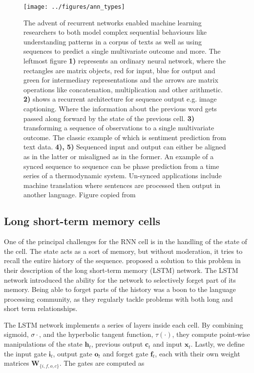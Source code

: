 \begin{figure}
\centering
\texttt{[image: ../figures/ann\_types]}
\caption[Archetypes of recurrent neural architectures]{The advent of recurrent networks enabled machine learning researchers to both model complex sequential behaviours like understanding patterns in a corpus of texts as well as using sequences to predict a single multivariate outcome and more. The leftmost figure \textbf{1)} represents an ordinary neural network, where the rectangles are matrix objects, red for input, blue for output and green for intermediary representations and the arrows are matrix operations like concatenation, multiplication and other arithmetic. \textbf{2)} shows a recurrent architecture for sequence output e.g. image captioning. Where the information about the previous word gets passed along forward by the state of the previous cell. \textbf{3)} transforming a sequence of observations to a single multivariate outcome. The classic example of which is sentiment prediction from text data. \textbf{4), 5)} Sequenced input and output can either be aligned as in the latter or misaligned as in the former. An example of a synced sequence to sequence can be phase prediction from a time series of a thermodynamic system. Un-synced applications include machine translation where sentences are processed then output in another language. Figure copied from \cite{Karpathy2015}}\label{fig:ann_architectures}
\end{figure}

\subsection{Long short-term memory cells}\label{sec:lstm}

One of the principal challenges for the RNN cell is in the handling of the state of the cell. The state acts as a sort of memory, but without moderation, it tries to recall the entire history of the sequence. \citet{Hochreiter1997} proposed a solution to this problem in their description of the long short-term memory (LSTM) network. The LSTM network introduced the ability for the network to selectively forget part of its memory. Being able to forget parts of the history was a boon to the language processing community, as they regularly tackle problems with both long and short term relationships. 

The LSTM network implements a series of layers inside each cell. By combining sigmoid, $\sigma{\cdot}$, and the hyperbolic tangent function, $\tau(\cdot)$, they compute point-wise manipulations of the state $\boldsymbol{h}_t$, previous output $\boldsymbol{c}_t$ and input $\boldsymbol{x}_t$. Lastly, we define the input gate $\boldsymbol{i}_t$, output gate $\boldsymbol{o}_t$ and forget gate $\boldsymbol{f}_t$, each with their own weight matrices $\boldsymbol{W}_{\{i, f, o, c\}}$. The gates are computed as

